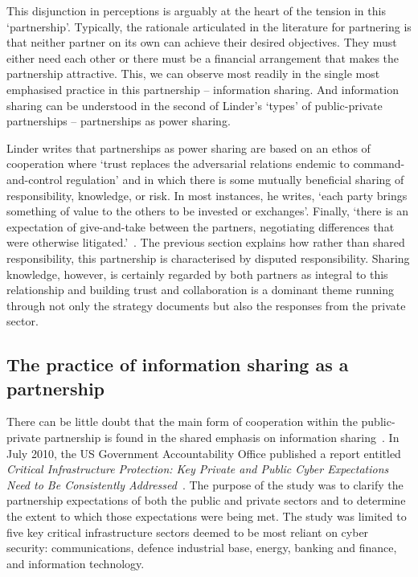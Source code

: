 \documentclass[a4paper,11pt]{article}
\begin{document}
This disjunction in perceptions is arguably at the heart of the
tension in this `partnership'. Typically, the rationale articulated in
the literature for partnering is that neither partner on its own can
achieve their desired objectives. They must either need each other or
there must be a financial arrangement that makes the partnership
attractive. This, we can observe most readily in the single most
emphasised practice in this partnership -- information sharing. And
information sharing can be understood in the second of Linder's
`types' of public-private partnerships -- partnerships as power
sharing.

Linder writes that partnerships as power sharing are based on an ethos
of cooperation where `trust replaces the adversarial relations endemic
to command-and-control regulation' and in which there is some mutually
beneficial sharing of responsibility, knowledge, or risk. In most
instances, he writes, `each party brings something of value to the
others to be invested or exchanges'. Finally, `there is an expectation
of give-and-take between the partners, negotiating differences that
were otherwise litigated.'~\cite{linder:1999}.  The previous section
explains how rather than shared responsibility, this partnership is
characterised by disputed responsibility. Sharing knowledge, however,
is certainly regarded by both partners as integral to this
relationship and building trust and collaboration is a dominant theme
running through not only the strategy documents but also the responses
from the private sector.

\subsection{The practice of information sharing as a partnership}

There can be little doubt that the main form of cooperation within the
public-private partnership is found in the shared emphasis on
information sharing~\cite{dunncavelty+suter:2009}. In July 2010, the
US Government Accountability Office published a report entitled
{\emph{Critical Infrastructure Protection: Key Private and Public
Cyber Expectations Need to Be Consistently
Addressed}}~\cite{usgao:2010}. The purpose of the study was to clarify
the partnership expectations of both the public and private sectors
and to determine the extent to which those expectations were being
met. The study was limited to five key critical infrastructure sectors
deemed to be most reliant on cyber security: communications, defence
industrial base, energy, banking and finance, and information
technology.
\end{document}
